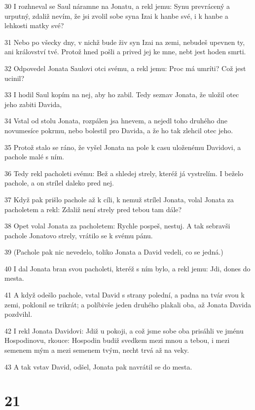 \par 30 I rozhneval se Saul náramne na Jonatu, a rekl jemu: Synu prevrácený a urputný, zdaliž nevím, že jsi zvolil sobe syna Izai k hanbe své, i k hanbe a lehkosti matky své?
\par 31 Nebo po všecky dny, v nichž bude živ syn Izai na zemi, nebudeš upevnen ty, ani království tvé. Protož hned pošli a prived jej ke mne, nebt jest hoden smrti.
\par 32 Odpovedel Jonata Saulovi otci svému, a rekl jemu: Proc má umríti? Což jest ucinil?
\par 33 I hodil Saul kopím na nej, aby ho zabil. Tedy seznav Jonata, že uložil otec jeho zabiti Davida,
\par 34 Vstal od stolu Jonata, rozpálen jsa hnevem, a nejedl toho druhého dne novumesíce pokrmu, nebo bolestil pro Davida, a že ho tak zlehcil otec jeho.
\par 35 Protož stalo se ráno, že vyšel Jonata na pole k casu uloženému Davidovi, a pachole malé s ním.
\par 36 Tedy rekl pacholeti svému: Bež a shledej strely, kteréž já vystrelím. I beželo pachole, a on strílel daleko pred nej.
\par 37 Když pak prišlo pachole až k cíli, k nemuž strílel Jonata, volal Jonata za pacholetem a rekl: Zdaliž není strely pred tebou tam dále?
\par 38 Opet volal Jonata za pacholetem: Rychle pospeš, nestuj. A tak sebravši pachole Jonatovo strely, vrátilo se k svému pánu.
\par 39 (Pachole pak nic nevedelo, toliko Jonata a David vedeli, co se jedná.)
\par 40 I dal Jonata bran svou pacholeti, kteréž s ním bylo, a rekl jemu: Jdi, dones do mesta.
\par 41 A když odešlo pachole, vstal David s strany polední, a padna na tvár svou k zemi, poklonil se trikrát; a políbivše jeden druhého plakali oba, až Jonata Davida pozdvihl.
\par 42 I rekl Jonata Davidovi: Jdiž u pokoji, a což jsme sobe oba prisáhli ve jménu Hospodinovu, rkouce: Hospodin budiž svedkem mezi mnou a tebou, i mezi semenem mým a mezi semenem tvým, necht trvá až na veky.
\par 43 A tak vstav David, odšel, Jonata pak navrátil se do mesta.

\chapter{21}


